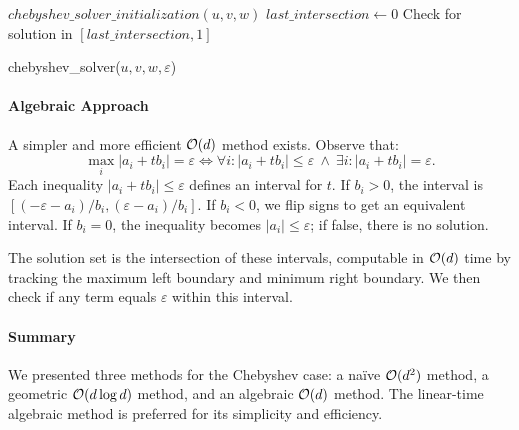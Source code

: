 \begin{algorithm}[ht]
  \DontPrintSemicolon
  \BlankLine
  \(chebyshev\_solver\_initialization(u, v, w)\) \;
  \(last\_intersection \gets 0\) \;
  Check for solution in \([last\_intersection, 1]\) \;

  \caption{chebyshev\_solver(\(u, v, w, \varepsilon\))}
  \label{algo:solve_chebyshev}
\end{algorithm}

\paragraph{Algebraic Approach}
A simpler and more efficient \(\mathcal{O}(d)\) method exists. Observe that:
	\[\max_{i} |a_i + t b_i| = \varepsilon \iff \forall i: |a_i + t b_i| \leq \varepsilon \ \land\ \exists i: |a_i + t b_i| = \varepsilon.\]
Each inequality \(|a_i + t b_i| \leq \varepsilon\) defines an interval for \(t\). If \(b_i > 0\), the interval is \([(-\varepsilon - a_i)/b_i, (\varepsilon - a_i)/b_i]\). If \(b_i < 0\), we flip signs to get an equivalent interval. If \(b_i = 0\), the inequality becomes \(|a_i| \leq \varepsilon\); if false, there is no solution.

The solution set is the intersection of these intervals, computable in \(\mathcal{O}(d)\) time by tracking the maximum left boundary and minimum right boundary. We then check if any term equals \(\varepsilon\) within this interval.

\paragraph{Summary}
We presented three methods for the Chebyshev case: a na\"ive \(\mathcal{O}(d^2)\) method, a geometric \(\mathcal{O}(d \log d)\) method, and an algebraic \(\mathcal{O}(d)\) method. The linear-time algebraic method is preferred for its simplicity and efficiency.

